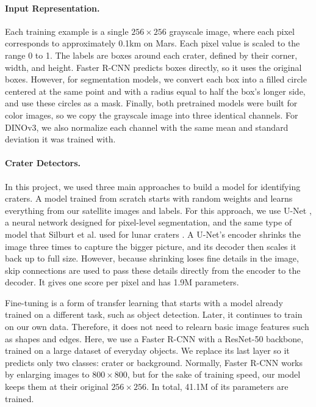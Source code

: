 \documentclass{article} %
\begin{document}
\paragraph{Input Representation.}
Each training example is a single $256 \times 256$ grayscale image, where each pixel corresponds to approximately 0.1km on Mars. Each pixel value is scaled to the range 0 to 1. The labels are boxes around each crater, defined by their corner, width, and height. Faster R-CNN predicts boxes directly, so it uses the original boxes. However, for segmentation models, we convert each box into a filled circle centered at the same point and with a radius equal to half the box's longer side, and use these circles as a mask. Finally, both pretrained models were built for color images, so we copy the grayscale image into three identical channels. For DINOv3, we also normalize each channel with the same mean and standard deviation it was trained with.

\paragraph{Crater Detectors.}
In this project, we used three main approaches to build a model for identifying craters. A model trained from scratch starts with random weights and learns everything from our satellite images and labels. For this approach, we use U-Net \cite{ronneberger2015}, a neural network designed for pixel-level segmentation, and the same type of model that Silburt et al. used for lunar craters \cite{silburt2019}. A U-Net's encoder shrinks the image three times to capture the bigger picture, and its decoder then scales it back up to full size. However, because shrinking loses fine details in the image, skip connections are used to pass these details directly from the encoder to the decoder. It gives one score per pixel and has 1.9M parameters.

Fine-tuning is a form of transfer learning that starts with a model already trained on a different task, such as object detection. Later, it continues to train on our own data. Therefore, it does not need to relearn basic image features such as shapes and edges. Here, we use a Faster R-CNN \cite{ren2015} with a ResNet-50 \cite{he2016} backbone, trained on a large dataset of everyday objects. We replace its last layer so it predicts only two classes: crater or background. Normally, Faster R-CNN works by enlarging images to $800 \times 800$, but for the sake of training speed, our model keeps them at their original $256 \times 256$. In total, 41.1M of its parameters are trained.
\end{document}
